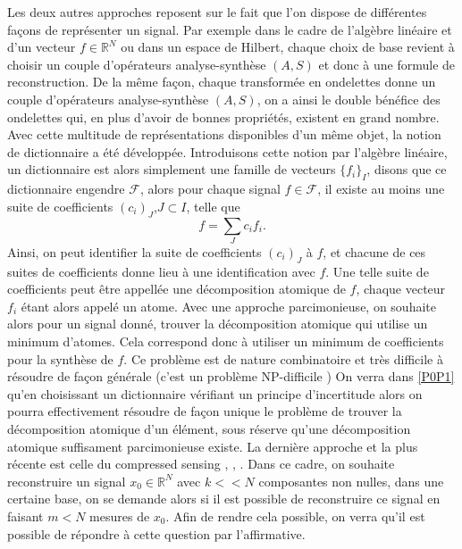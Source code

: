 Les deux autres approches reposent sur le fait que l'on dispose de différentes façons de représenter un signal.
Par exemple dans le cadre de l'algèbre linéaire et d'un vecteur $f \in \mathbb{R}^N$ ou dans un espace de Hilbert, chaque choix de base revient à choisir un couple d'opérateurs analyse-synthèse $(A, S)$ et donc à une formule de reconstruction.
De la même façon, chaque transformée en ondelettes donne un couple d'opérateurs analyse-synthèse $(A, S)$, on a ainsi le double bénéfice des ondelettes qui, en plus d'avoir de bonnes propriétés, existent en grand nombre.
\newline 
Avec cette multitude de représentations disponibles d'un même objet, la notion de dictionnaire a été développée.
Introduisons cette notion par l'algèbre linéaire, un dictionnaire est alors simplement une famille de vecteurs $\{f_i\}_I$, disons que ce dictionnaire engendre $\mathcal{F}$, alors pour chaque signal $f\in\mathcal{F}$, il existe au moins une suite de coefficients $(c_i)_J$,$J\subset I$, telle que
\begin{equation}
	f = \sum_J c_i f_i.
\end{equation}
Ainsi, on peut identifier la suite de coefficients $(c_i)_J$ à $f$, et chacune de ces suites de coefficients donne lieu à une identification avec $f$.
Une telle suite de coefficients peut être appellée une décomposition atomique de $f$, chaque vecteur $f_i$ étant alors appelé un atome.
Avec une approche parcimonieuse, on souhaite alors pour un signal donné, trouver la décomposition atomique qui utilise un minimum d'atomes. 
Cela correspond donc à utiliser un minimum de coefficients pour la synthèse de $f$.
\newline
Ce problème est de nature combinatoire et très difficile à résoudre de façon générale (c'est un problème NP-difficile \cite{NPHard})
On verra dans \ref{P0P1} qu'en choisissant un dictionnaire vérifiant un principe d'incertitude alors on pourra effectivement résoudre de façon unique le problème de trouver la décomposition atomique d'un élément, sous réserve qu'une décomposition atomique suffisament parcimonieuse existe.  
\newline
La dernière approche et la plus récente est celle du compressed sensing \cite{DonohoCS}, \cite{CandesTaoUniv}, \cite{CandesSparsityIncoherence}. 
Dans ce cadre, on souhaite reconstruire un signal $x_0 \in \mathbb{R}^N$ avec $k << N$ composantes non nulles, dans une certaine base, on se demande alors si il est possible de reconstruire ce signal en faisant $m<N$ mesures de $x_0$.
Afin de rendre cela possible, on verra qu'il est possible de répondre à cette question par l'affirmative.
